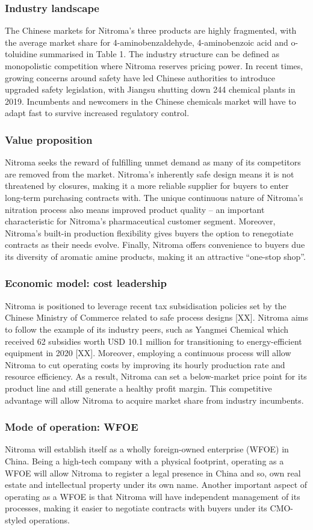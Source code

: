 \subsubsection{Industry landscape}
The Chinese markets for Nitroma’s three products are highly fragmented, with the average market share for 4-aminobenzaldehyde, 4-aminobenzoic acid and o-toluidine summarised in Table 1. The industry structure can be defined as monopolistic competition where Nitroma reserves pricing power. In recent times, growing concerns around safety have led Chinese authorities to introduce upgraded safety legislation, with Jiangsu shutting down 244 chemical plants in 2019. Incumbents and newcomers in the Chinese chemicals market will have to adapt fast to survive increased regulatory control.
\subsubsection{Value proposition}
Nitroma seeks the reward of fulfilling unmet demand as many of its competitors are removed from the market. Nitroma’s inherently safe design means it is not threatened by closures, making it a more reliable supplier for buyers to enter long-term purchasing contracts with. The unique continuous nature of Nitroma’s nitration process also means improved product quality – an important characteristic for Nitroma’s pharmaceutical customer segment. Moreover, Nitroma’s built-in production flexibility gives buyers the option to renegotiate contracts as their needs evolve. Finally, Nitroma offers convenience to buyers due its diversity of aromatic amine products, making it an attractive “one-stop shop”.
\subsubsection{Economic model: cost leadership}
Nitroma is positioned to leverage recent tax subsidisation policies set by the Chinese Ministry of Commerce related to safe process designs [XX]. Nitroma aims to follow the example of its industry peers, such as Yangmei Chemical which received 62 subsidies worth USD 10.1 million for transitioning to energy-efficient equipment in 2020 [XX]. Moreover, employing a continuous process will allow Nitroma to cut operating costs by improving its hourly production rate and resource efficiency. As a result, Nitroma can set a below-market price point for its product line and still generate a healthy profit margin. This competitive advantage will allow Nitroma to acquire market share from industry incumbents. 
\subsubsection{Mode of operation: WFOE}
Nitroma will establish itself as a wholly foreign-owned enterprise (WFOE) in China. Being a high-tech company with a physical footprint, operating as a WFOE will allow Nitroma to register a legal presence in China and so, own real estate and intellectual property under its own name. Another important aspect of operating as a WFOE is that Nitroma will have independent management of its processes, making it easier to negotiate contracts with buyers under its CMO-styled operations.

